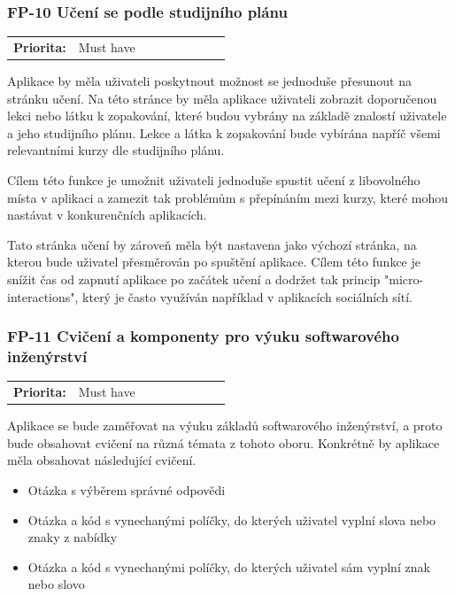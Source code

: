 \subsubsection{FP-10 Učení se podle studijního plánu}

\begin{tabular}{lp{0.7\linewidth}}
    \textbf{Priorita:} & Must have \\
\end{tabular}

Aplikace by měla uživateli poskytnout možnost se jednoduše přesunout na stránku učení. Na této stránce by měla aplikace uživateli zobrazit doporučenou lekci nebo látku k zopakování, které budou vybrány na základě znalostí uživatele a jeho studijního plánu. Lekce a látka k zopakování bude vybírána napříč všemi relevantními kurzy dle studijního plánu.

Cílem této funkce je umožnit uživateli jednoduše spustit učení z libovolného místa v aplikaci a zamezit tak problémům s přepínáním mezi kurzy, které mohou nastávat v konkurenčních aplikacích.

Tato stránka učení by zároveň měla být nastavena jako výchozí stránka, na kterou bude uživatel přesměrován po spuštění aplikace. Cílem této funkce je snížit čas od zapnutí aplikace po začátek učení a dodržet tak princip "micro-interactions", který je často využíván například v aplikacích sociálních sítí. %

\subsubsection{FP-11 Cvičení a komponenty pro výuku softwarového inženýrství} 

\begin{tabular}{lp{0.7\linewidth}}
    \textbf{Priorita:} & Must have \\
\end{tabular}

Aplikace se bude zaměřovat na výuku základů softwarového inženýrství, a proto bude obsahovat cvičení na různá témata z tohoto oboru. %
Konkrétně by aplikace měla obsahovat následující cvičení.

\begin{itemize}
    \item Otázka s výběrem správné odpovědi
    \item Otázka a kód s vynechanými políčky, do kterých uživatel vyplní slova nebo znaky z nabídky
    \item Otázka a kód s vynechanými políčky, do kterých uživatel sám vyplní znak nebo slovo
\end{itemize}

